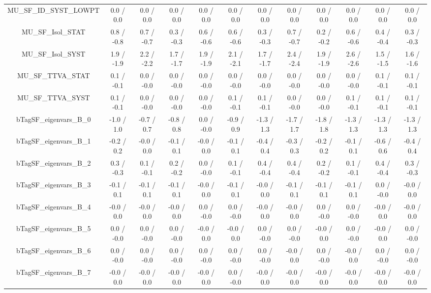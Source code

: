 \begin{table}[htbp]
\begin{center}
\begin{tabular}{|c|c|c|c|c|c|c|c|c|c|c|c|}
  MU_SF_ID_SYST_LOWPT & 0.0 / 0.0 & 0.0 / 0.0 & 0.0 / 0.0 & 0.0 / 0.0 & 0.0 / 0.0 & 0.0 / 0.0 & 0.0 / 0.0 & 0.0 / 0.0 & 0.0 / 0.0 & 0.0 / 0.0 & 0.0 / 0.0 \\ 
  MU_SF_Isol_STAT & 0.8 / -0.8 & 0.7 / -0.7 & 0.3 / -0.3 & 0.6 / -0.6 & 0.6 / -0.6 & 0.3 / -0.3 & 0.7 / -0.7 & 0.2 / -0.2 & 0.6 / -0.6 & 0.4 / -0.4 & 0.3 / -0.3 \\ 
  MU_SF_Isol_SYST & 1.9 / -1.9 & 2.2 / -2.2 & 1.7 / -1.7 & 1.9 / -1.9 & 2.1 / -2.1 & 1.7 / -1.7 & 2.4 / -2.4 & 1.9 / -1.9 & 2.6 / -2.6 & 1.5 / -1.5 & 1.6 / -1.6 \\ 
  MU_SF_TTVA_STAT & 0.1 / -0.1 & 0.0 / -0.0 & 0.0 / -0.0 & 0.0 / -0.0 & 0.0 / -0.0 & 0.0 / -0.0 & 0.0 / -0.0 & 0.0 / -0.0 & 0.0 / -0.0 & 0.1 / -0.1 & 0.1 / -0.1 \\ 
  MU_SF_TTVA_SYST & 0.1 / -0.1 & 0.0 / -0.0 & 0.0 / -0.0 & 0.0 / -0.0 & 0.1 / -0.1 & 0.1 / -0.1 & 0.0 / -0.0 & 0.0 / -0.0 & 0.1 / -0.1 & 0.1 / -0.1 & 0.1 / -0.1 \\ 
  bTagSF_eigenvars_B_0 & -1.0 / 1.0 & -0.7 / 0.7 & -0.8 / 0.8 & 0.0 / -0.0 & -0.9 / 0.9 & -1.3 / 1.3 & -1.7 / 1.7 & -1.8 / 1.8 & -1.3 / 1.3 & -1.3 / 1.3 & -1.3 / 1.3 \\ 
  bTagSF_eigenvars_B_1 & -0.2 / 0.2 & -0.0 / 0.0 & -0.1 / 0.1 & -0.0 / 0.0 & -0.1 / 0.1 & -0.4 / 0.4 & -0.3 / 0.3 & -0.2 / 0.2 & -0.1 / 0.1 & -0.6 / 0.6 & -0.4 / 0.4 \\ 
  bTagSF_eigenvars_B_2 & 0.3 / -0.3 & 0.1 / -0.1 & 0.2 / -0.2 & 0.0 / -0.0 & 0.1 / -0.1 & 0.4 / -0.4 & 0.4 / -0.4 & 0.2 / -0.2 & 0.1 / -0.1 & 0.4 / -0.4 & 0.3 / -0.3 \\ 
  bTagSF_eigenvars_B_3 & -0.1 / 0.1 & -0.1 / 0.1 & -0.1 / 0.1 & -0.0 / 0.0 & -0.1 / 0.1 & -0.0 / 0.0 & -0.1 / 0.1 & -0.1 / 0.1 & -0.1 / 0.1 & 0.0 / -0.0 & -0.0 / 0.0 \\ 
  bTagSF_eigenvars_B_4 & -0.0 / 0.0 & -0.0 / 0.0 & -0.0 / 0.0 & 0.0 / -0.0 & 0.0 / -0.0 & -0.0 / 0.0 & -0.0 / 0.0 & 0.0 / -0.0 & 0.0 / -0.0 & -0.0 / 0.0 & -0.0 / 0.0 \\ 
  bTagSF_eigenvars_B_5 & 0.0 / -0.0 & 0.0 / -0.0 & 0.0 / -0.0 & -0.0 / 0.0 & -0.0 / 0.0 & 0.0 / -0.0 & 0.0 / -0.0 & -0.0 / 0.0 & 0.0 / -0.0 & -0.0 / 0.0 & 0.0 / -0.0 \\ 
  bTagSF_eigenvars_B_6 & 0.0 / -0.0 & 0.0 / -0.0 & 0.0 / -0.0 & 0.0 / -0.0 & 0.0 / -0.0 & 0.0 / -0.0 & -0.0 / 0.0 & 0.0 / -0.0 & -0.0 / 0.0 & 0.0 / -0.0 & 0.0 / -0.0 \\ 
  bTagSF_eigenvars_B_7 & -0.0 / 0.0 & -0.0 / 0.0 & -0.0 / 0.0 & -0.0 / 0.0 & 0.0 / -0.0 & -0.0 / 0.0 & -0.0 / 0.0 & -0.0 / 0.0 & -0.0 / 0.0 & -0.0 / 0.0 & -0.0 / 0.0 \\ 

\end{tabular}
\end{center}
\end{table}
